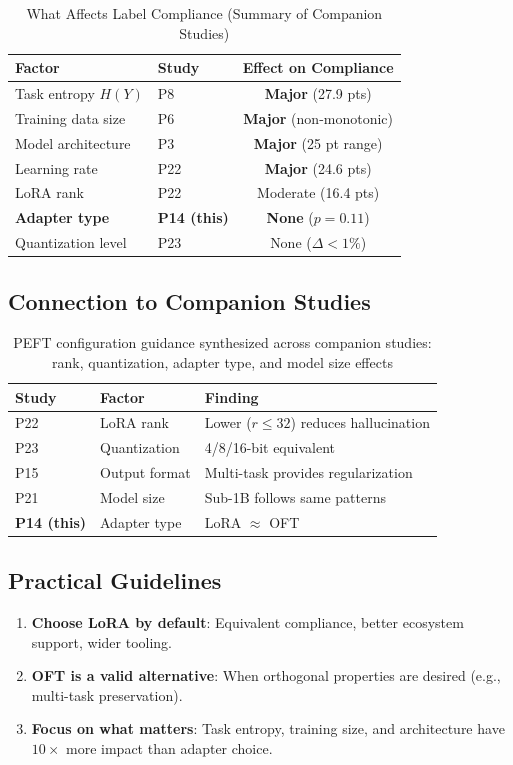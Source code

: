 \documentclass[review,3p]{elsarticle}
\begin{document}
\begin{table}[!ht]
\centering\caption{What Affects Label Compliance (Summary of Companion Studies)}
\label{tab:factors}
\begin{tabular}{llc}
\toprule
\textbf{Factor} & \textbf{Study} & \textbf{Effect on Compliance} \\
\midrule
Task entropy $H(Y)$ & P8~\cite{p8} & \textbf{Major} (27.9 pts) \\
Training data size & P6~\cite{p6} & \textbf{Major} (non-monotonic) \\
Model architecture & P3~\cite{p3} & \textbf{Major} (25 pt range) \\
Learning rate & P22~\cite{p22} & \textbf{Major} (24.6 pts) \\
LoRA rank & P22~\cite{p22} & Moderate (16.4 pts) \\
\midrule
\textbf{Adapter type} & \textbf{P14 (this)} & \textbf{None} ($p = 0.11$) \\
Quantization level & P23~\cite{p23} & None ($\Delta < 1\%$) \\
\bottomrule
\end{tabular}
\end{table}

\subsection{Connection to Companion Studies}
\begin{table}[!ht]
\centering\caption{PEFT configuration guidance synthesized across companion studies: rank, quantization, adapter type, and model size effects}
\label{tab:cross}
\begin{tabular}{lll}
\toprule
\textbf{Study} & \textbf{Factor} & \textbf{Finding} \\
\midrule
P22~\cite{p22} & LoRA rank & Lower ($r \leq 32$) reduces hallucination \\
P23~\cite{p23} & Quantization & 4/8/16-bit equivalent \\
P15~\cite{p15} & Output format & Multi-task provides regularization \\
P21~\cite{p21} & Model size & Sub-1B follows same patterns \\
\textbf{P14 (this)} & Adapter type & LoRA $\approx$ OFT \\
\bottomrule
\end{tabular}
\end{table}

\subsection{Practical Guidelines}
\begin{enumerate}
\item \textbf{Choose LoRA by default}: Equivalent compliance, better ecosystem support, wider tooling.
\item \textbf{OFT is a valid alternative}: When orthogonal properties are desired (e.g., multi-task preservation).
\item \textbf{Focus on what matters}: Task entropy, training size, and architecture have $10\times$ more impact than adapter choice.
\end{enumerate}
\end{document}
